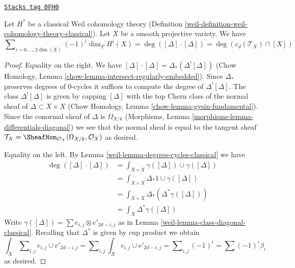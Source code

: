 \begin{lemma}
\label{weil-lemma-square-diagonal-classical}
\href{https://stacks.math.columbia.edu/tag/0FH0}{\texttt{Stacks tag 0FH0}}

Let $H^*$ be a classical Weil cohomology theory
(Definition \ref{weil-definition-weil-cohomology-theory-classical}).
Let $X$ be a smooth projective variety. We have
$$
\sum\nolimits_{i = 0, \ldots, 2\dim(X)} (-1)^i\dim_F H^i(X) =
\deg([\Delta] \cdot [\Delta]) = \deg(c_d(\mathcal{T}_X) \cap [X])
$$
\end{lemma}

\begin{proof}

Equality on the right. We have
$[\Delta] \cdot [\Delta] = \Delta_*(\Delta^![\Delta])$
(Chow Homology, Lemma \ref{chow-lemma-intersect-regularly-embedded}).
Since $\Delta_*$ preserves degrees of $0$-cycles it suffices to compute
the degree of $\Delta^![\Delta]$. The class $\Delta^![\Delta]$ is given
by capping $[\Delta]$ with
the top Chern class of the normal sheaf of $\Delta \subset X \times X$
(Chow Homology, Lemma \ref{chow-lemma-gysin-fundamental}).
Since the conormal sheaf of $\Delta$ is $\Omega_{X/k}$
(Morphisms, Lemma \ref{morphisms-lemma-differentials-diagonal})
we see that the normal sheaf is equal to the tangent sheaf
$\mathcal{T}_X = \SheafHom_{\mathcal{O}_X}(\Omega_{X/k}, \mathcal{O}_X)$
as desired.

\medskip\noindent
Equality on the left. By Lemma \ref{weil-lemma-degrees-cycles-classical} we have
\begin{align*}
\deg([\Delta] \cdot [\Delta])
& =
\int_{X \times X} \gamma([\Delta]) \cup \gamma([\Delta]) \\
& =
\int_{X \times X} \Delta_*1 \cup \gamma([\Delta]) \\
& =
\int_{X \times X} \Delta_*(\Delta^*\gamma([\Delta])) \\
& =
\int_X \Delta^*\gamma([\Delta])
\end{align*}
Write $\gamma([\Delta]) = \sum  e_{i, j} \otimes e'_{2d - i , j}$
as in Lemma \ref{weil-lemma-class-diagonal-classical}.
Recalling that $\Delta^*$ is given by cup product we obtain
$$
\int_X \sum\nolimits_{i, j} e_{i, j} \cup e'_{2d - i, j} =
\sum\nolimits_{i, j} \int_X e_{i, j} \cup e'_{2d - i, j} =
\sum\nolimits_{i, j} (-1)^i = \sum (-1)^i\beta_i
$$
as desired.
\end{proof}


